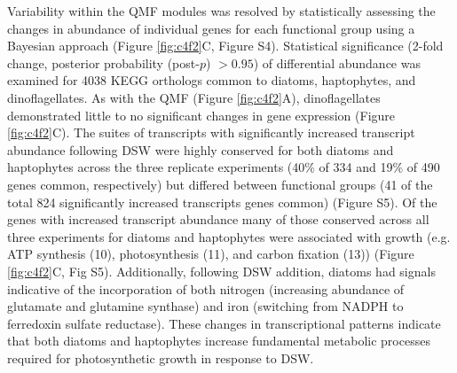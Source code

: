 Variability within the QMF modules was resolved by statistically assessing the changes in abundance of individual genes for each functional group using a Bayesian approach \citep{Wu2010} (Figure \ref{fig:c4f2}C, Figure S4). Statistical significance (2-fold change, posterior probability (post-$p$) $> 0.95$) of differential abundance was examined for 4038 KEGG orthologs common to diatoms, haptophytes, and dinoflagellates. As with the QMF (Figure \ref{fig:c4f2}A), dinoflagellates demonstrated little to no significant changes in gene expression (Figure \ref{fig:c4f2}C). The suites of transcripts with significantly increased transcript abundance following DSW were highly conserved for both diatoms and haptophytes across the three replicate experiments (40\% of 334 and 19\% of 490 genes common, respectively) but differed between functional groups (41 of the total 824 significantly increased transcripts genes common) (Figure S5). Of the genes with increased transcript abundance many of those conserved across all three experiments for diatoms and haptophytes were associated with growth (e.g. ATP synthesis (10), photosynthesis (11), and carbon fixation (13)) (Figure \ref{fig:c4f2}C, Fig S5). Additionally, following DSW addition, diatoms had signals indicative of the incorporation of both nitrogen (increasing abundance of glutamate and glutamine synthase) and iron (switching from NADPH to ferredoxin sulfate reductase). These changes in transcriptional patterns indicate that both diatoms and haptophytes increase fundamental metabolic processes required for photosynthetic growth in response to DSW. \par
